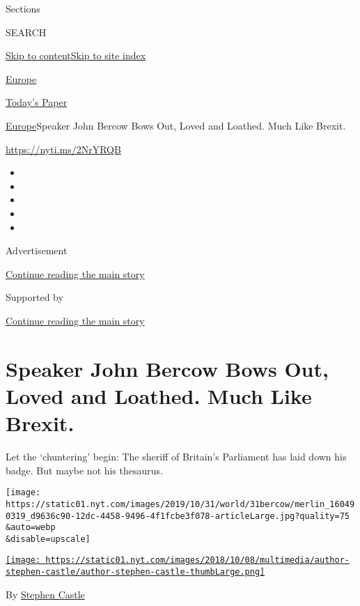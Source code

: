 Sections

SEARCH

\protect\hyperlink{site-content}{Skip to
content}\protect\hyperlink{site-index}{Skip to site index}

\href{https://www.nytimes.com/section/world/europe}{Europe}

\href{https://myaccount.nytimes.com/auth/login?response_type=cookie\&client_id=vi}{}

\href{https://www.nytimes.com/section/todayspaper}{Today's Paper}

\href{/section/world/europe}{Europe}\textbar{}Speaker John Bercow Bows
Out, Loved and Loathed. Much Like Brexit.

\url{https://nyti.ms/2NrYRQB}

\begin{itemize}
\item
\item
\item
\item
\item
\end{itemize}

Advertisement

\protect\hyperlink{after-top}{Continue reading the main story}

Supported by

\protect\hyperlink{after-sponsor}{Continue reading the main story}

\hypertarget{speaker-john-bercow-bows-out-loved-and-loathed-much-like-brexit}{%
\section{Speaker John Bercow Bows Out, Loved and Loathed. Much Like
Brexit.}\label{speaker-john-bercow-bows-out-loved-and-loathed-much-like-brexit}}

Let the `chuntering' begin: The sheriff of Britain's Parliament has laid
down his badge. But maybe not his thesaurus.

\texttt{[image: https://static01.nyt.com/images/2019/10/31/world/31bercow/merlin\_160490319\_d9636c90-12dc-4458-9496-4f1fcbe3f078-articleLarge.jpg?quality=75\\\&auto=webp\\\&disable=upscale]}

\href{https://www.nytimes.com/by/stephen-castle}{\texttt{[image: https://static01.nyt.com/images/2018/10/08/multimedia/author-stephen-castle/author-stephen-castle-thumbLarge.png]}}

By \href{https://www.nytimes.com/by/stephen-castle}{Stephen Castle}

